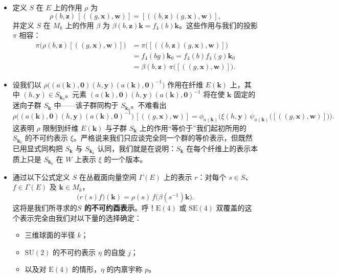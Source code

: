 \begin{itemize}
\begin{align*}
&\quad=\phi_{a(\mathbf{k})}\big(\psi_{a(\mathbf{k})}(\mathbf{c})+\psi_{a(\mathbf{k})}(\mathbf{d})\big),
\end{align*}
与原定义一致。
\item 定义 $S$ 在 $E$ 上的作用 $\rho$ 为
\[
\rho(b,\mathbf{z})\,[((g,\mathbf{x}),\mathbf{w})]=[((b,\mathbf{z})(g,\mathbf{x}),\mathbf{w})],
\]
并定义 $S$ 在 $M_k$ 上的作用 $\beta$ 为 $\beta(b,\mathbf{z})\mathbf{k}=f_4(b)\mathbf{k}$。这些作用与我们的投影 $\pi$ 相容：
\begin{align*}
\pi\big(\rho(b,\mathbf{z})[((g,\mathbf{x}),\mathbf{w})]\big)
&=\pi\big([((b,\mathbf{z})(g,\mathbf{x}),\mathbf{w})]\big)\\
&=f_4(bg)\mathbf{k}_0=f_4(b)f_4(g)\mathbf{k}_0\\
&=\beta(b,\mathbf{z})\,\pi\big([((g,\mathbf{x}),\mathbf{w})]\big).
\end{align*}
\item 设我们以 $\rho\big((a(\mathbf{k}),\mathbf{0})(h,\mathbf{y})(a(\mathbf{k}),\mathbf{0})^{-1}\big)$ 作用在纤维 $E(\mathbf{k})$ 上，其中 $(h,\mathbf{y})\in S_{\mathbf{k}_0}$。元素 $(a(\mathbf{k}),\mathbf{0})(h,\mathbf{y})(a(\mathbf{k}),\mathbf{0})^{-1}$ 将在使 $\mathbf{k}$ 固定的迷向子群 $S_{\mathbf{k}}$ 中——该子群同构于 $S_{\mathbf{k}_0}$。不难看出
\[
\rho\big((a(\mathbf{k}),\mathbf{0})(h,\mathbf{y})(a(\mathbf{k}),\mathbf{0})^{-1}\big)\,[((g,\mathbf{x}),\mathbf{w})]
=\phi_{a(\mathbf{k})}\Big(\xi(h,\mathbf{y})\,\psi_{a(\mathbf{k})}\big([((g,\mathbf{x}),\mathbf{w})]\big)\Big).
\]
这表明 $\rho$ 限制到纤维 $E(\mathbf{k})$ 与子群 $S_{\mathbf{k}}$ 上的作用“等价于”我们起初所用的 $S_{\mathbf{k}_0}$ 的不可约表示 $\xi$。严格说来我们只应谈完全同一个群的等价表示，但既然已用显式同构把 $S_{\mathbf{k}}$ 与 $S_{\mathbf{k}_0}$ 认同，我们就是在说明：$S_{\mathbf{k}}$ 在每个纤维上的表示本质上只是 $S_{\mathbf{k}_0}$ 在 $W$ 上表示 $\xi$ 的一个版本。
\item 通过以下公式定义 $S$ 在丛截面向量空间 $\Gamma(E)$ 上的表示 $r$：对每个 $s\in S$、$f\in\Gamma(E)$ 及 $\mathbf{k}\in M_k$，
\[
\big(r(s)f\big)(\mathbf{k})=\rho(s)\,f\big(\beta(s^{-1})\mathbf{k}\big).
\]
这将是我们所寻求的\textbf{$S$ 的不可约酉表示}。呼！$\mathrm{E}(4)$ 或 $\mathrm{SE}(4)$ 双覆盖的这个表示完全由我们对以下量的选择确定：
\begin{itemize}
\item 三维球面的半径 $k$；
\item $\mathrm{SU}(2)$ 的不可约表示 $\eta$ 的自旋 $j$；
\item 以及对 $\mathrm{E}(4)$ 的情形，$\eta$ 的内禀宇称 $p$。
\end{itemize}
\end{itemize}

